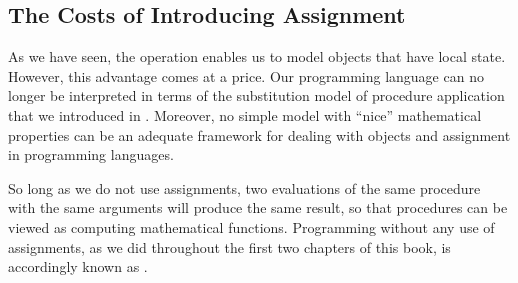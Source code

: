 \subsection{The Costs of Introducing Assignment}
\label{Section 3.1.3}

As we have seen, the  operation enables us to model objects that have local state.
However, this advantage comes at a price.
Our programming language can no longer be interpreted in terms of the substitution model of procedure application that we introduced in .
Moreover, no simple model with “nice” mathematical properties can be an adequate framework for dealing with objects and assignment in programming languages.

So long as we do not use assignments, two evaluations of the same procedure with the same arguments will produce the same result, so that procedures can be viewed as computing mathematical functions.
Programming without any use of assignments, as we did throughout the first two chapters of this book, is accordingly known as .

